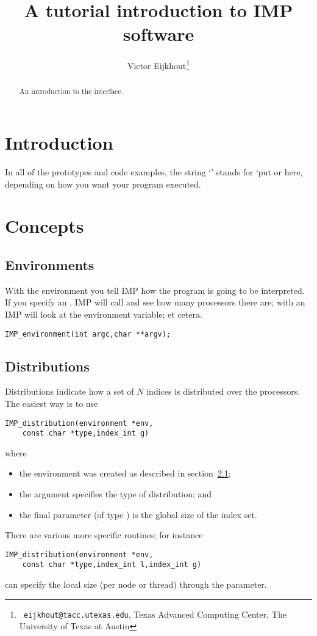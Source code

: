 \documentclass[11pt,fleqn,preprint]{impreport}
\title[IMP tutorial]{A tutorial introduction to IMP software}
\author[Eijkhout]{Victor Eijkhout\thanks{{\tt
      eijkhout@tacc.utexas.edu}, Texas Advanced Computing Center, The
    University of Texas at Austin}}
\begin{document}
\maketitle

\begin{abstract}
An introduction to the interface.
\end{abstract}

\section{Introduction}

In all of the prototypes and code examples, the string `' stands for
`put  or  here, depending on how you want your program executed.

\section{Concepts}

\subsection{Environments}
\label{sec:env}

With the environment you tell IMP how the program is going to be interpreted.
If you specify an , IMP will call  and see how
many processors there are; with an  IMP will look at the
 environment variable; et cetera.

\begin{verbatim}
IMP_environment(int argc,char **argv);
\end{verbatim}

\subsection{Distributions}

Distributions indicate how a set of $N$ indices is distributed over the processors.
The easiest way is to use
\begin{verbatim}
IMP_distribution(environment *env,
    const char *type,index_int g)
\end{verbatim}
where
\begin{itemize}
\item the environment was created as described in section~\ref{sec:env};
\item the  argument specifies the type of distribution; and
\item the final parameter (of type ) is the global size of the index set.
\end{itemize}
There are various more specific routines; for instance
\begin{verbatim}
IMP_distribution(environment *env,
    const char *type,index_int l,index_int g)
\end{verbatim}
can specify the local size (per node or thread) through the  parameter.
\end{document}
